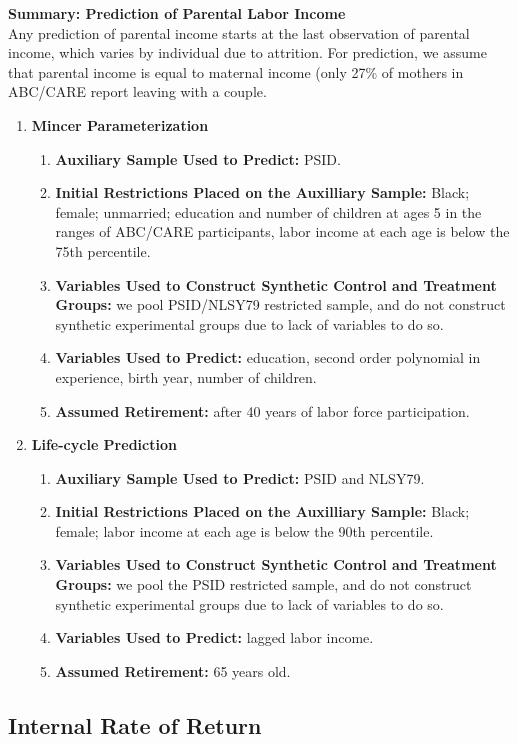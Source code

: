 \noindent \textbf{Summary: Prediction of Parental Labor Income}\\
\noindent Any prediction of parental income starts at the last observation of parental income, which varies by individual due to attrition. For prediction, we assume that parental income is equal to maternal income (only 27\% of mothers in ABC/CARE report leaving with a couple.
\begin{enumerate}
\item \textbf{Mincer Parameterization}
\begin{enumerate}
\item \textbf{Auxiliary Sample Used to Predict:} PSID.
\item \textbf{Initial Restrictions Placed on the Auxilliary Sample:} Black; female; unmarried; education and number of children at ages 5 in the ranges of ABC/CARE participants, labor income at each age is below the 75th percentile.
\item \textbf{Variables Used to Construct Synthetic Control and Treatment Groups:} we pool PSID/NLSY79 restricted sample, and do not construct synthetic experimental groups due to lack of variables to do so.
\item \textbf{Variables Used to Predict:} education, second order polynomial in experience, birth year, number of children.
\item \textbf{Assumed Retirement:} after 40 years of labor force participation.
\end{enumerate}
\item \textbf{Life-cycle Prediction}
\begin{enumerate}
\item \textbf{Auxiliary Sample Used to Predict:} PSID and NLSY79.
\item \textbf{Initial Restrictions Placed on the Auxilliary Sample:} Black; female; labor income at each age is below the 90th percentile. 
\item \textbf{Variables Used to Construct Synthetic Control and Treatment Groups:} we pool the PSID restricted sample, and do not construct synthetic experimental groups due to lack of variables to do so.
\item \textbf{Variables Used to Predict:} lagged labor income.
\item \textbf{Assumed Retirement:} 65 years old.
\end{enumerate}
\end{enumerate}

\subsection{Internal Rate of Return}
\label{app:method_irr}

